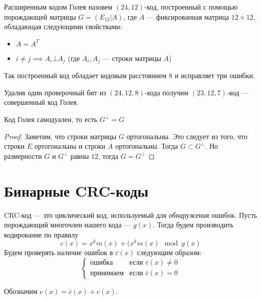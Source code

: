 \begin{definition}
Расширенным кодом Голея назовем $(24,12)$-код, построенный с помощью 
порождающей матрицы $G = (E_{12} | A)$, где $A$ --- фиксированная матрица
$12 \times 12$, обладающая следующими свойствами:
\begin{itemize}
\item $A = A^{T}$
\item $i \neq j \implies A_i \bot A_j$ (где $A_i, A_j$ --- строки матрицы $A$)
\end{itemize}

\end{definition}

\begin{proposition}
Так построенный код обладает кодовым расстоянием $8$ и исправляет три ошибки.
\end{proposition}

\begin{remark}
Удалив один проверочный бит из $(24,12,8)$-кода получим $(23,12,7)$-код ---
совершенный код Голея.
\end{remark}

\begin{proposition}
Код Голея самодуален, то есть $G^{\bot} = G$
\end{proposition}

\begin{proof}
Заметим, что строки матрицы $G$ ортогональны. Это следует из того, что строки $E$
ортогональны и строки $A$ ортогональны. Тогда $G \subset G^{\bot}$. Но 
размерности $G$ и $G^{\bot}$ равны $12$, тогда $G = G^{\bot}$
\end{proof}

\section{Бинарные CRC-коды}

\begin{definition}
 CRC-код --- это циклический код, используемый для \emph{обнаружения} ошибок.
 Пусть порождающий многочлен нашего кода --- $g(x)$. Тогда
 будем производить кодирование по правилу $$c(x) = x^{k} m(x) + (x^k m(x) \mod g(x)$$
 Будем проверять наличие ошибок в $\bar{c}(x)$ следующим образом:
 $$\begin{cases} \text{ошибка} & \text{если } \bar{c}(x) \neq 0 \\
				\text{принимаем} & \text{если } \bar{c}(x) = 0 
	\end{cases}$$
	
Обозначим $e(x) = \bar{c}(x) + c(x)$.
\end{definition}



